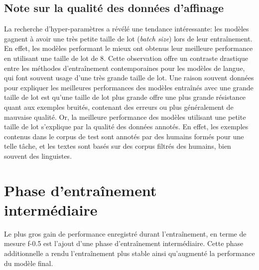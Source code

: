 \documentclass[12pt,twoside,maitrise]{dms}
\theoremstyle{definition}
\numberwithin{equation}{section}
\numberwithin{table}{chapter}
\numberwithin{figure}{chapter}
\begin{document}

\subsection{Note sur la qualité des données d'affinage}
La recherche d'hyper-paramètres a révélé une tendance intéressante:
les modèles gagnent à avoir une très petite taille de lot
(\textit{batch size}) lors de leur entraînement. En effet, les modèles
performant le mieux ont obtenus leur meilleure performance en
utilisant une taille de lot de 8. Cette observation offre un contraste
drastique entre les méthodes d'entraînement contemporaines pour les
modèles de langue, qui font souvent usage d'une très grande taille de
lot. Une raison souvent données pour expliquer les meilleures
performances des modèles entraînés avec une grande taille de lot est
qu'une taille de lot plus grande offre une plus grande résistance
quant aux exemples bruités, contenant des erreurs ou plus généralement
de mauvaise qualité. Or, la meilleure performance des modèles
utilisant une petite taille de lot s'explique par la qualité des
données annotés. En effet, les exemples contenus dans le corpus de
test sont annotés par des humains formés pour une telle tâche, et les
textes sont basés sur des corpus filtrés des humains, bien souvent des
linguistes.
\section{Phase d'entraînement intermédiaire}
Le plus gros gain de performance enregistré durant l'entraînement, en
terme de mesure f-0.5 est l'ajout d'une phase d'entraînement
intermédiaire. Cette phase additionnelle a rendu l'entraînement plus
stable ainsi qu'augmenté la performance du modèle final.
\end{document}
